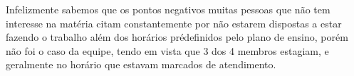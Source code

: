 Infelizmente sabemos que os pontos negativos muitas pessoas que não tem interesse na matéria citam constantemente por não estarem dispostas a estar fazendo o trabalho além dos horários prédefinidos pelo plano de ensino, porém não foi o caso da equipe, tendo em vista que 3 dos 4 membros estagiam, e geralmente no horário que estavam marcados de atendimento.